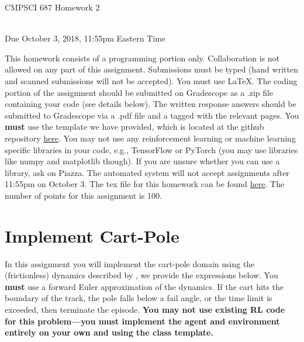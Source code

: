 \documentclass[]{article}
\begin{document}
\newpage
\begin{center}
    \begin{Large}
    CMPSCI 687 Homework 2
    \end{Large}
    \\
    Due October 3, 2018, 11:55pm Eastern Time
\end{center}

 This homework  consists of a programming portion only. Collaboration is not allowed on any part of this assignment. Submissions must be typed (hand written and scanned submissions will not be accepted). You must use \LaTeX. The coding portion of the assignment should be submitted on Gradescope as a .zip file containing your code (see details below). The written response answers should be submitted to Gradescope via a .pdf file and a tagged with the relevant pages. You \textbf{must} use the template we have provided, which is located at the github repository \href{https://github.com/bmetevier/rl-framework-687-public}{here}. You may not use any reinforcement learning or machine learning specific libraries in your code, e.g., TensorFlow or PyTorch (you may use libraries like numpy and matplotlib though). If you are unsure whether you can use a library, ask on Piazza. The automated system will not accept assignments after 11:55pm on October 3. The tex file for this homework can be found \href{https://people.cs.umass.edu/~pthomas/courses/CMPSCI_687_Fall2019/hw2Source.tex}{here}. The number of points for this assignment is 100. 

\section*{Implement Cart-Pole}

In this assignment you will implement the cart-pole domain using the (frictionless) dynamics described by \citet[Equations 23 and 24]{Florian2007}, we provide the expressions below. 
You \textbf{must} use a forward Euler approximation of the dynamics. If the cart hits the boundary of the track, the pole falls below a fail angle, or the time limit is exceeded, then terminate the episode.
%
\textbf{You may not use existing RL code for this problem---you must implement the agent and environment entirely on your own and using the class template.} 
\end{document}
